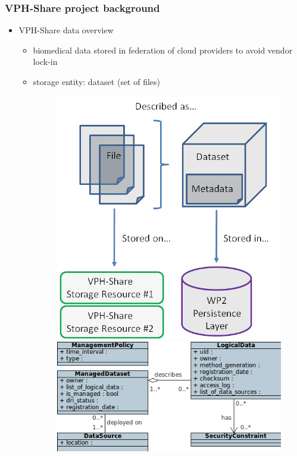 \documentclass[9pt]{beamer}
\begin{document}
\begin{frame}
\frametitle{\hspace{5mm} \textbf{VPH-Share project background}}
\begin{block}{}
\begin{itemize}
	\item VPH-Share data overview
	\begin{itemize}
		\item biomedical data stored in federation of cloud providers to avoid vendor lock-in
		\item storage entity: dataset (set of files)
		\begin{figure}
			\centering
			\includegraphics[scale=0.15]{img/managed-dataset.png}
			\hspace{1cm}
			\includegraphics[scale=0.4]{img/data_model.png}

\end{figure}
\end{itemize}
\end{itemize}
\end{block}
\end{frame}
\end{document}
